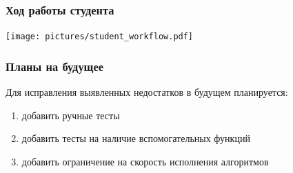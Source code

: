 \documentclass[aspectratio=169]{beamer}
\begin{document}
\appendix

\begin{frame}
	\frametitle{Ход работы студента}

	\begin{center}
		\texttt{[image: pictures/student\_workflow.pdf]}
	\end{center}

\end{frame}

\begin{frame}
	\frametitle{Планы на будущее}

	Для исправления выявленных недостатков в будущем планируется:
	\begin{enumerate}
		\item добавить ручные тесты
		\item добавить тесты на наличие вспомогательных функций
		\item добавить ограничение на скорость исполнения алгоритмов
	\end{enumerate}

\end{frame}
\end{document}

